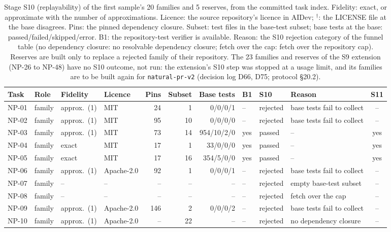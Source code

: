 \begin{table}[t]\centering\scriptsize\setlength{\tabcolsep}{4pt}
\caption{Stage S10 (replayability) of the first sample's 20 families and 5 reserves, from the committed task index. Fidelity: exact, or approximate with the number of approximations. Licence: the source repository's licence in AIDev; $^{\dagger}$: the LICENSE file at the base disagrees. Pins: the pinned dependency closure. Subset: test files in the base-test subset; base tests at the base: passed/failed/skipped/error. B1: the repository-test verifier is available. Reason: the S10 rejection category of the funnel table (no dependency closure: no resolvable dependency closure; fetch over the cap: fetch over the repository cap). Reserves are built only to replace a rejected family of their repository. The 23 families and reserves of the S9 extension (NP-26 to NP-48) have no S10 outcome, not run: the extension's S10 step was stopped at a usage limit, and its families are to be built again for \texttt{natural-pr-v2} (decision log D66, D75; protocol \S20.2).}\label{tab:natural-s10}
\begin{tabular}{llllrrrlllc}\toprule Task & Role & Fidelity & Licence & Pins & Subset & Base tests & B1 & S10 & Reason & S11 \\\midrule
NP-01 & family & approx.\ (1) & MIT & 24 & 1 & 0/0/0/1 & -- & rejected & base tests fail to collect & -- \\
NP-02 & family & approx.\ (1) & MIT & 95 & 10 & 0/0/0/0 & -- & rejected & base tests fail to collect & -- \\
NP-03 & family & approx.\ (1) & MIT & 73 & 14 & 954/10/2/0 & yes & passed & -- & yes \\
NP-04 & family & exact & MIT & 17 & 1 & 33/0/0/0 & yes & passed & -- & yes \\
NP-05 & family & exact & MIT & 17 & 16 & 354/5/0/0 & yes & passed & -- & yes \\
NP-06 & family & approx.\ (1) & Apache-2.0 & 92 & 1 & 0/0/0/1 & -- & rejected & base tests fail to collect & -- \\
NP-07 & family & -- & -- & -- & -- & -- & -- & rejected & empty base-test subset & -- \\
NP-08 & family & -- & -- & -- & -- & -- & -- & rejected & fetch over the cap & -- \\
NP-09 & family & approx.\ (1) & Apache-2.0 & 146 & 2 & 0/0/0/2 & -- & rejected & base tests fail to collect & -- \\
NP-10 & family & approx.\ (1) & Apache-2.0 & -- & 22 & -- & -- & rejected & no dependency closure & -- \\

\end{tabular}
\end{table}
